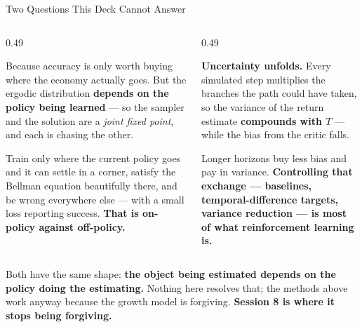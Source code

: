 \begin{frame}{Two Questions This Deck Cannot Answer}
\begin{columns}[T]
\begin{column}{0.49\textwidth}
\begin{conceptbox}[title=\textbf{Why sample along the state space at all?}]\footnotesize
Because accuracy is only worth buying where the economy actually goes. But the ergodic distribution \textbf{depends on the policy being learned} --- so the sampler and the solution are a \emph{joint fixed point}, and each is chasing the other.
\end{conceptbox}
\smallskip
{\footnotesize Train only where the current policy goes and it can settle in a corner, satisfy the Bellman equation beautifully there, and be wrong everywhere else --- with a small loss reporting success. \textbf{That is on-policy against off-policy.}}
\end{column}
\begin{column}{0.49\textwidth}
\begin{conceptbox}[title=\textbf{What goes wrong in a $T$-step rollout?}]\small
\textbf{Uncertainty unfolds.} Every simulated step multiplies the branches the path could have taken, so the variance of the return estimate \textbf{compounds with $T$} --- while the bias from the critic falls.
\end{conceptbox}
\smallskip
{\footnotesize Longer horizons buy less bias and pay in variance. \textbf{Controlling that exchange --- baselines, temporal-difference targets, variance reduction --- is most of what reinforcement learning is.}}
\end{column}
\end{columns}
\smallskip
\begin{takeawaybox}\footnotesize
Both have the same shape: \textbf{the object being estimated depends on the policy doing the estimating.} Nothing here resolves that; the methods above work anyway because the growth model is forgiving. \textbf{Session 8 is where it stops being forgiving.}
\end{takeawaybox}
\end{frame}

